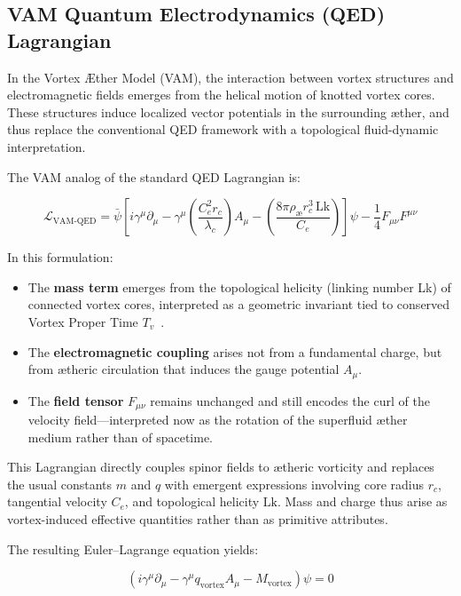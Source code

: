 \subsection*{VAM Quantum Electrodynamics (QED) Lagrangian}

In the Vortex Æther Model (VAM), the interaction between vortex structures and electromagnetic fields emerges from the helical motion of knotted vortex cores. These structures induce localized vector potentials in the surrounding æther, and thus replace the conventional QED framework with a topological fluid-dynamic interpretation.

The VAM analog of the standard QED Lagrangian is:

\begin{equation}
    \mathcal{L}_\text{VAM-QED} =
    \bar{\psi} \left[ i \gamma^\mu \partial_\mu
                   - \gamma^\mu \left( \frac{C_e^2 r_c}{\lambda_c} \right) A_\mu
                   - \left( \frac{8\pi \rho_\text{\ae} r_c^3 \, \text{Lk}}{C_e} \right) \right] \psi
    - \frac{1}{4} F_{\mu\nu} F^{\mu\nu}
\end{equation}

In this formulation:
\begin{itemize}
    \item The \textbf{mass term} emerges from the topological helicity (linking number Lk) of connected vortex cores, interpreted as a geometric invariant tied to conserved Vortex Proper Time \( T_v \)~\cite{volovik2003}.
    \item The \textbf{electromagnetic coupling} arises not from a fundamental charge, but from ætheric circulation that induces the gauge potential \( A_\mu \).
    \item The \textbf{field tensor} \( F_{\mu\nu} \) remains unchanged and still encodes the curl of the velocity field—interpreted now as the rotation of the superfluid æther medium rather than of spacetime.
\end{itemize}

This Lagrangian directly couples spinor fields to ætheric vorticity and replaces the usual constants \( m \) and \( q \) with emergent expressions involving core radius \( r_c \), tangential velocity \( C_e \), and topological helicity \( \text{Lk} \). Mass and charge thus arise as vortex-induced effective quantities rather than as primitive attributes.

The resulting Euler–Lagrange equation yields:

\begin{equation}
    \boxed{
    \left( i \gamma^\mu \partial_\mu
         - \gamma^\mu q_\text{vortex} A_\mu
         - M_\text{vortex}
    \right)\psi = 0
    }
\end{equation}

